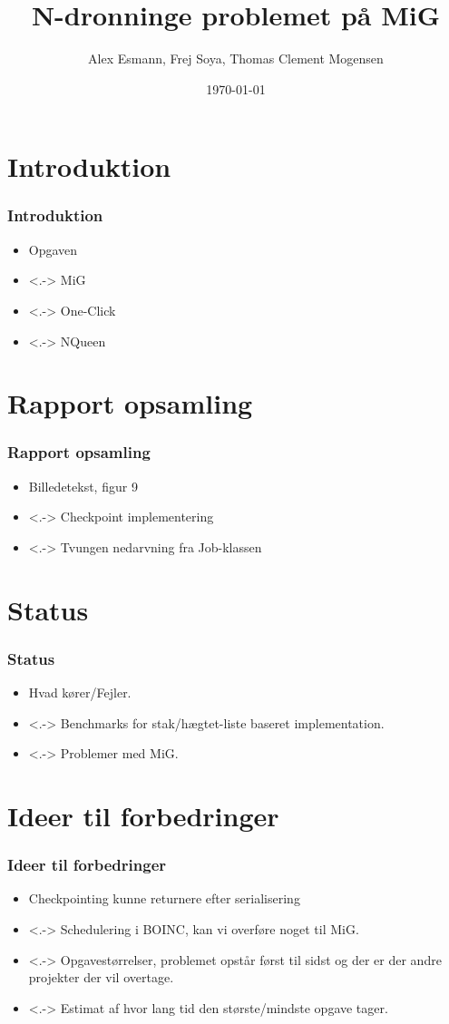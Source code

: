 \documentclass{beamer}
\title{N-dronninge problemet på MiG}
\author{Alex Esmann, Frej Soya, Thomas Clement Mogensen}
\date{\today}
\begin{document}
\frame{\titlepage}
\frame{\tableofcontents}
\section{Introduktion}
\frame
{
	\frametitle{Introduktion}

	\begin{itemize}
	\item<1-> Opgaven
	\item<.-> MiG
	\item<.-> One-Click
	\item<.-> NQueen
	\end{itemize}
}


\section{Rapport opsamling}
\frame
{
  \frametitle{Rapport opsamling}

  \begin{itemize}
  \item<1-> Billedetekst, figur 9
  \item<.-> Checkpoint implementering
  \item<.-> Tvungen nedarvning fra Job-klassen
  \end{itemize}
}

\section{Status}
\frame
{
  \frametitle{Status}

  \begin{itemize}
  \item<1-> Hvad kører/Fejler.
  \item<.-> Benchmarks for stak/hægtet-liste baseret implementation.
  \item<.-> Problemer med MiG.      
  \end{itemize}
}

\section{Ideer til forbedringer}
\frame
{
  \frametitle{Ideer til forbedringer}

  \begin{itemize}
  \item<1-> Checkpointing kunne returnere efter serialisering
  \item<.-> Schedulering i BOINC, kan vi overføre noget til MiG.
  \item<.-> Opgavestørrelser, problemet opstår først til sidst og der er der andre projekter der vil overtage.      
	\item<.-> Estimat af hvor lang tid den største/mindste opgave tager. 
  \end{itemize}
}
\end{document}
